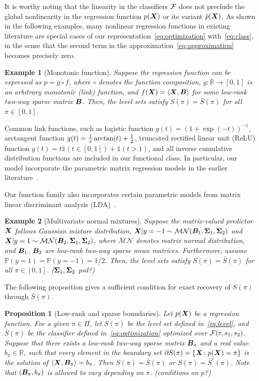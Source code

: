 \documentclass[12pt]{article}
\newtheorem{prop}{Proposition}
\newtheorem{example}{Example}
\begin{document}
It is worthy noting that the linearity in the classifiers $\mathcal{F}$ does not preclude the global nonlinearity in the regression function $p(\bm X)$ or its variant $\bar p(\bm X)$. As shown in the following examples, many nonlinear regression functions in existing literature are special cases of our representation~\eqref{eq:optimization} with~\eqref{eq:class}, in the sense that the second term in the approximation~\eqref{eq:approximation} becomes precisely zero. 

\begin{example}[Monotonic function] Suppose the regression function can be expressed as $p = g\circ f$, where $\circ$ denotes the function composition, $g\colon \mathbb{R}\to [0,1]$ is an arbitrary monotonic (link) function, and $f(\bm X)=\langle \bm X, \bm B\rangle$ for some low-rank  two-way sparse matrix $\bm B$. Then, the level sets satisfy $S(\pi)=\bar S(\pi)$ for all $\pi\in[0,1]$.
\end{example}

Common link functions, such as logistic function $g(t)=(1+\exp(-t))^{-1}$, arctangent function $g(t)={1\over \pi}\arctan(t)+{1\over 2}$, truncated rectified linear unit (ReLU) function $g(t)=t\mathds{1}(t\in[0,1])+\mathds{1}(t>1)$, and all inverse cumulative distribution functions are included in our functional class. In particular, our model incorporate the parametric matrix regression models in the earlier literature~\citep{zhou2014regularized,guha2020bayesian,relion2019network}. 

Our function family also incorporates certain parametric models from matrix linear discriminant analysis (LDA)~\citep{hu2020matrix}. 
\begin{example}[Multivariate normal mixtures] Suppose the matrix-valued predictor $\bm X$ follows Gaussian mixture distribution, $\bm X|y=-1 \sim \mathcal{MN}(\bm B_1,\bm \Sigma_1, \bm \Sigma_2)$ and $ \bm X|y=1 \sim \mathcal{MN}(\bm B_2,\bm \Sigma_1, \bm \Sigma_2)$, where $\mathcal{MN}$ denotes matrix normal distribution, and $\bm B_1$, $\bm B_2$ are low-rank two-way sparse mean matrices. Furthermore, assume $\mathbb{P}(y=1)=\mathbb{P}(y=-1)=1/2$. Then, the level sets satisfy $S(\pi)=\bar S(\pi)$ for all $\pi\in[0,1]$. {\color{red}($\bm \Sigma_1, \bm \Sigma_2$ psd?)}
\end{example}

The following proposition gives a sufficient condition for exact recovery of $S(\pi)$ through $\bar S(\pi)$. 
\begin{prop}[Low-rank and sparse boundaries] Let $p(\bm X)$ be a regression function. For a given $\pi\in\Pi$, let $S(\pi)$ be the level set defined in~\eqref{eq:level}, and $\bar S(\pi)$ be the classifier defined in~\eqref{eq:optimization} optimized over $\mathcal{F}(r,s_1,s_2)$. Suppose that there exists a low-rank two-way sparse matrix $\bm B_\pi$ and a real value $b_\pi\in\mathbb{R}$, such that every element in the boundary set $\partial S(\pi)=\{\bm X\colon p(\bm X)=\pi\}$ is the solution of $\langle \bm X, \bm B_\pi \rangle = b_\pi$. Then $S(\pi)=\bar S(\pi)$ or $S(\pi)=\bar S^c(\pi)$.  Note that $(\bm B_\pi, b_\pi)$ is allowed to vary depending on $\pi$. {\color{red}(conditions on $p$?)}
\end{prop}
\end{document}
